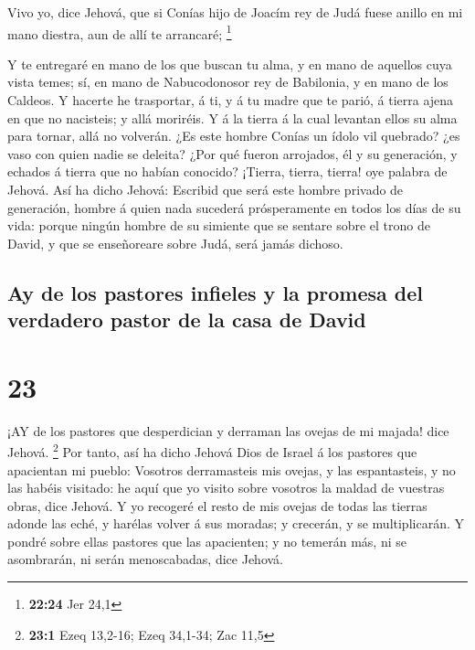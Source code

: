  Vivo yo, dice Jehová, que si Conías hijo de Joacím rey de
Judá fuese anillo en mi mano diestra, aun de allí te arrancaré;
\footnote{\textbf{22:24} Jer 24,1}

 Y te entregaré en mano de los que buscan tu alma, y en
mano de aquellos cuya vista temes; sí, en mano de Nabucodonosor rey de
Babilonia, y en mano de los Caldeos.  Y hacerte he
trasportar, á ti, y á tu madre que te parió, á tierra ajena en que no
nacisteis; y allá moriréis.  Y á la tierra á la cual
levantan ellos su alma para tornar, allá no volverán.  ¿Es
este hombre Conías un ídolo vil quebrado? ¿es vaso con quien nadie se
deleita? ¿Por qué fueron arrojados, él y su generación, y echados á
tierra que no habían conocido?  ¡Tierra, tierra, tierra!
oye palabra de Jehová.  Así ha dicho Jehová: Escribid que
será este hombre privado de generación, hombre á quien nada sucederá
prósperamente en todos los días de su vida: porque ningún hombre de su
simiente que se sentare sobre el trono de David, y que se enseñoreare
sobre Judá, será jamás dichoso.

\hypertarget{ay-de-los-pastores-infieles-y-la-promesa-del-verdadero-pastor-de-la-casa-de-david}{%
\subsection{Ay de los pastores infieles y la promesa del verdadero
pastor de la casa de
David}\label{ay-de-los-pastores-infieles-y-la-promesa-del-verdadero-pastor-de-la-casa-de-david}}

\hypertarget{section-22}{%
\section{23}\label{section-22}}

 ¡AY de los pastores que desperdician y derraman las ovejas
de mi majada! dice Jehová. \footnote{\textbf{23:1} Ezeq 13,2-16; Ezeq
  34,1-34; Zac 11,5}  Por tanto, así ha dicho Jehová Dios de
Israel á los pastores que apacientan mi pueblo: Vosotros derramasteis
mis ovejas, y las espantasteis, y no las habéis visitado: he aquí que yo
visito sobre vosotros la maldad de vuestras obras, dice Jehová.
 Y yo recogeré el resto de mis ovejas de todas las tierras
adonde las eché, y harélas volver á sus moradas; y crecerán, y se
multiplicarán.  Y pondré sobre ellas pastores que las
apacienten; y no temerán más, ni se asombrarán, ni serán menoscabadas,
dice Jehová.

